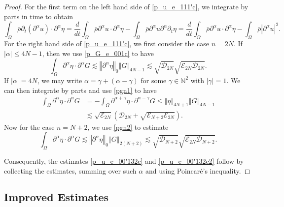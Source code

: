 \documentclass[a4paper,reqno,11pt]{amsart}
\numberwithin{equation}{section}
\providecommand{\abs}[1]{\left\vert#1\right\vert}
\providecommand{\norm}[1]{\left\Vert#1\right\Vert}
\providecommand{\sd}[1]{\mathcal{D}_{#1}}
\providecommand{\se}[1]{\mathcal{E}_{#1}}
\providecommand{\norm}[1]{\left\Vert#1\right\Vert}
\begin{document}
\begin{proof}
For the first term on the left hand side of \eqref{p_u_e_111'c}, we integrate by parts in time to obtain
\begin{equation}
\int_\Omega \bar \rho {\partial_t} (\partial^\alpha    u) \cdot \partial^\alpha \eta
={ \frac{d}{dt}}\int_\Omega \bar \rho  \partial^\alpha    u \cdot \partial^\alpha \eta- \int_\Omega \bar \rho   \partial^\alpha  u\partial^\alpha  {\partial_t}\eta={ \frac{d}{dt}}\int_\Omega \bar \rho  \partial^\alpha    u \cdot \partial^\alpha \eta- \int_\Omega \bar \rho  \abs{\partial^\alpha u }^2.
\end{equation}
For the right hand side of \eqref{p_u_e_111'c}, we first consider the case $n=2N$. If $\abs{\alpha}\le 4N-1$, then we use \eqref{p_G_e_001c} to have
\begin{equation}
\int_\Omega   {\partial}^{\alpha} \eta \cdot  {\partial}^{\alpha} G     {\lesssim}  \norm{{\partial}^{\alpha}  \eta}_{0}  \norm{   G }_{4N-1}
 {\lesssim} \sqrt{ \sd{2N}}\sqrt{ \se{2N} \sd{2N}}.
\end{equation}
If $\abs{\alpha}= 4N$, we may write $\alpha = \gamma +(\alpha-\gamma)$ for some $\gamma \in \mathbb{N}^2$ with $\abs{\gamma}=1$. We can then integrate by parts and use \eqref{pgn1} to have
\begin{equation}
\begin{split}
  \int_\Omega     {\partial}^{\alpha}   \eta \cdot   {\partial}^{\alpha}  G   &=- \int_\Omega     {\partial}^{\alpha+\gamma}   \eta \cdot   {\partial}^{\alpha-\gamma}  G
 \le \norm{ \eta}_{4N+1}  \norm{   G  }_{4N-1} \\&
{\lesssim} \sqrt{ \se{2N} }\left(\sd{2N}+ \sqrt{ \se{N+2} \se{2N}} \right).
\end{split}
\end{equation}
Now for the case $n=N+2$, we use \eqref{pgn2} to estimate
\begin{equation}
\int_\Omega   {\partial}^{\alpha} \eta \cdot  {\partial}^{\alpha} G
 {\lesssim} \norm{{\partial}^{\alpha}  \eta}_{0}  \norm{   G }_{2(N+2)}{\lesssim} \sqrt{ \sd{N+2} }\sqrt{\se{2N}\sd{N+2}}.
\end{equation}

Consequently, the estimates \eqref{p_u_e_00'132c} and \eqref{p_u_e_00'132c2} follow by collecting the estimates, summing over such $\alpha$ and using Poincar\'e's inequality.
\end{proof}

\subsection{Improved Estimates}
\end{document}
